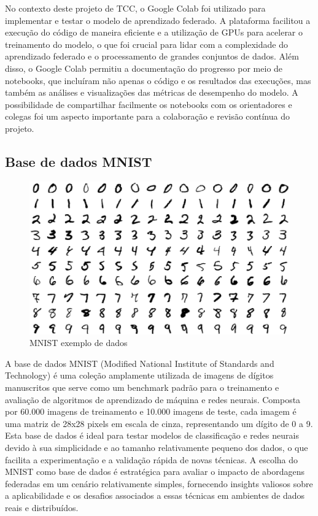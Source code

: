No contexto deste projeto de TCC, o Google Colab foi utilizado para implementar e testar o modelo de aprendizado federado. A plataforma facilitou a execução do código de maneira eficiente e a utilização de GPUs para acelerar o treinamento do modelo, o que foi crucial para lidar com a complexidade do aprendizado federado e o processamento de grandes conjuntos de dados. Além disso, o Google Colab permitiu a documentação do progresso por meio de notebooks, que incluíram não apenas o código e os resultados das execuções, mas também as análises e visualizações das métricas de desempenho do modelo. A possibilidade de compartilhar facilmente os notebooks com os orientadores e colegas foi um aspecto importante para a colaboração e revisão contínua do projeto.

\subsection{Base de dados MNIST}

\begin{figure}[ht]
	\centering
	\includegraphics[scale=0.25]{figuras/referencialTecnologico/mnist.eps}
	\caption{MNIST exemplo de dados}
	\label{fig:mnist}
\end{figure}

A base de dados MNIST (Modified National Institute of Standards and Technology) é uma coleção amplamente utilizada de imagens de dígitos manuscritos que serve como um benchmark padrão para o treinamento e avaliação de algoritmos de aprendizado de máquina e redes neurais. Composta por 60.000 imagens de treinamento e 10.000 imagens de teste, cada imagem é uma matriz de 28x28 pixels em escala de cinza, representando um dígito de 0 a 9. Esta base de dados é ideal para testar modelos de classificação e redes neurais devido à sua simplicidade e ao tamanho relativamente pequeno dos dados, o que facilita a experimentação e a validação rápida de novas técnicas. A escolha do MNIST como base de dados é estratégica para avaliar o impacto de abordagens federadas em um cenário relativamente simples, fornecendo insights valiosos sobre a aplicabilidade e os desafios associados a essas técnicas em ambientes de dados reais e distribuídos.

